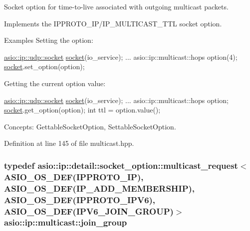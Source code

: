 Socket option for time-\/to-\/live associated with outgoing multicast packets. 

Implements the I\+P\+P\+R\+O\+T\+O\+\_\+\+I\+P/\+I\+P\+\_\+\+M\+U\+L\+T\+I\+C\+A\+S\+T\+\_\+\+T\+T\+L socket option.

\begin{DoxyParagraph}{Examples}
Setting the option\+: 
\begin{DoxyCode}
\hyperlink{classasio_1_1basic__datagram__socket}{asio::ip::udp::socket} \hyperlink{namespacewebsocketpp_1_1transport_1_1asio_1_1socket_1_1error_a828ddaa5ed63a761e1b557465a35f05aa0c31b356014843e1d09514e794a539a7}{socket}(io\_service); 
...
asio::ip::multicast::hops option(4);
\hyperlink{namespacewebsocketpp_1_1transport_1_1asio_1_1socket_1_1error_a828ddaa5ed63a761e1b557465a35f05aa0c31b356014843e1d09514e794a539a7}{socket}.set\_option(option);
\end{DoxyCode}

\end{DoxyParagraph}
\begin{DoxyParagraph}{}
Getting the current option value\+: 
\begin{DoxyCode}
\hyperlink{classasio_1_1basic__datagram__socket}{asio::ip::udp::socket} \hyperlink{namespacewebsocketpp_1_1transport_1_1asio_1_1socket_1_1error_a828ddaa5ed63a761e1b557465a35f05aa0c31b356014843e1d09514e794a539a7}{socket}(io\_service); 
...
asio::ip::multicast::hops option;
\hyperlink{namespacewebsocketpp_1_1transport_1_1asio_1_1socket_1_1error_a828ddaa5ed63a761e1b557465a35f05aa0c31b356014843e1d09514e794a539a7}{socket}.get\_option(option);
\textcolor{keywordtype}{int} ttl = option.value();
\end{DoxyCode}

\end{DoxyParagraph}
\begin{DoxyParagraph}{Concepts\+:}
Gettable\+Socket\+Option, Settable\+Socket\+Option. 
\end{DoxyParagraph}


Definition at line 145 of file multicast.\+hpp.

\hypertarget{namespaceasio_1_1ip_1_1multicast_af1296ad63123b3adc414c0bbeb328db3}{}
\subsubsection[{join\+\_\+group}]{\setlength{\rightskip}{0pt plus 5cm}typedef {\bf asio\+::ip\+::detail\+::socket\+\_\+option\+::multicast\+\_\+request}$<$ {\bf A\+S\+I\+O\+\_\+\+O\+S\+\_\+\+D\+E\+F}(I\+P\+P\+R\+O\+T\+O\+\_\+\+I\+P), {\bf A\+S\+I\+O\+\_\+\+O\+S\+\_\+\+D\+E\+F}(I\+P\+\_\+\+A\+D\+D\+\_\+\+M\+E\+M\+B\+E\+R\+S\+H\+I\+P), {\bf A\+S\+I\+O\+\_\+\+O\+S\+\_\+\+D\+E\+F}(I\+P\+P\+R\+O\+T\+O\+\_\+\+I\+P\+V6), {\bf A\+S\+I\+O\+\_\+\+O\+S\+\_\+\+D\+E\+F}(I\+P\+V6\+\_\+\+J\+O\+I\+N\+\_\+\+G\+R\+O\+U\+P)$>$ {\bf asio\+::ip\+::multicast\+::join\+\_\+group}}\label{namespaceasio_1_1ip_1_1multicast_af1296ad63123b3adc414c0bbeb328db3}


